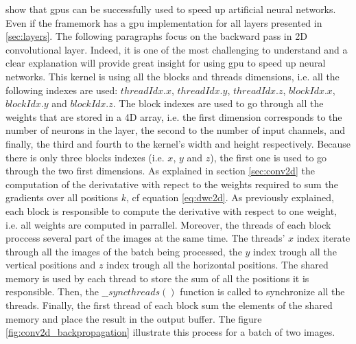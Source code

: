 \documentclass[11pt]{report}
\begin{document}
\noindent \textcite{DBLP:journals/tjs/BritoFCSWMF16} show that \acrshort{gpu}s can be successfully used to speed up artificial neural networks. Even if the framemork has a \acrshort{gpu} implementation for all layers presented in \ref{sec:layers}. The following paragraphs focus on the backward pass in 2D convolutional layer. Indeed, it is one of the most challenging to understand and a clear explanation will provide great insight for using \acrshort{gpu} to speed up neural networks. This kernel is using all the blocks and threads dimensions, i.e. all the following indexes are used: $threadIdx.x$, $threadIdx.y$, $threadIdx.z$, $blockIdx.x$, $blockIdx.y$ and $blockIdx.z$. The block indexes are used to go through all the weights that are stored in a 4D array, i.e. the first dimension corresponds to the number of neurons in the layer, the second to the number of input channels, and finally, the third and fourth to the kernel's width and height respectively. Because there is only three blocks indexes (i.e. $x$, $y$ and $z$), the first one is used to go through the two first dimensions. As explained in section \ref{sec:conv2d} the computation of the derivatative with repect to the weights required to sum the gradients over all positions $k$, cf equation \ref{eq:dwc2d}. As previously explained, each block is responsible to compute the derivative with respect to one weight, i.e. all weights are computed in parrallel. Moreover, the threads of each block proccess several part of the images at the same time. The threads' $x$ index iterate through all the images of the batch being processed, the $y$ index trough all the vertical positions and $z$ index trough all the horizontal positions. The shared memory is used by each thread to store the sum of all the positions it is responsible. Then, the $\_\_syncthreads()$ function is called to synchronize all the threads. Finally, the first thread of each block sum the elements of the shared memory and place the result in the output buffer. The figure \ref{fig:conv2d_backpropagation} illustrate this process for a batch of two images.
\end{document}
